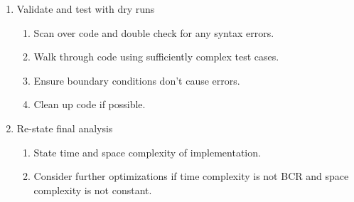 \documentclass{article}
\begin{document}
\begin{enumerate}
     \item Validate and test with dry runs
    \begin{enumerate}
        \item Scan over code and double check for any syntax errors.
        \item Walk through code using sufficiently complex test cases.
        \item Ensure boundary conditions don't cause errors.
        \item Clean up code if possible.
    \end{enumerate}
    
     \item Re-state final analysis
    \begin{enumerate}
        \item State time and space complexity of implementation.
        \item Consider further optimizations if time complexity is not BCR and space complexity is not constant.
    \end{enumerate}
\end{enumerate}

    
    
    
    

\end{document}
